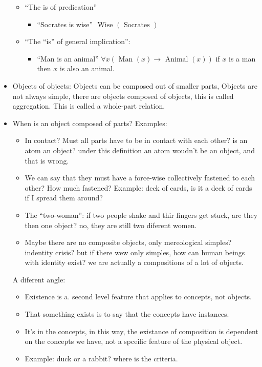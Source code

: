 \begin{itemize}
\begin{itemize}
            \item ``The is of predication''
                \begin{itemize}
                    \item ``Socrates is wise'' $\text{ Wise }(\text{ Socrates })$ 
                \end{itemize}
            
            \item ``The ``is'' of general implication'':
                \begin{itemize}
                    \item ``Man is an animal'' $\forall x (\text{ Man }(x) \rightarrow \text{ Animal }(x))$  if $x$ is a man then $x$ is also an animal.
                \end{itemize}
        \end{itemize}
    
    \item Objects of objects: Objects can be composed out of smaller parts, Objects are not always simple, there are objects composed of objects, this is called aggregation. This is called a whole-part relation.
    \item When is an object composed of parts?
        \newline Examples: 
        \begin{itemize}
            \item In contact? Must all parts have to be in contact with each other? is an atom an object? under this definition an atom woudn't be an  object, and that is wrong.
            \item We can say that they must have a force-wise collectively fastened to each other? How much fastened? Example: deck of cards, is it a deck of cards if I spread them around? 
            \item The ``two-woman'': if two people shake and thir fingers get stuck, are they then one object? no, they are still two diferent women.
            \item Maybe there are no composite objects, only mereological simples? indentity crisis? but if there wew only simples, how can human beings with identity exist? we are actually a compositions of a lot of objects.
        \end{itemize}
        A diferent angle: 
        \begin{itemize}
            \item Existence is a. second level feature that applies to concepts, not objects.
            \item That something exists is to say that the concepts have instances.
            \item It's in the concepts, in this way, the existance of composition is dependent on the concepts we have, not a spceific feature of the physical object.
            \item Example: duck or a rabbit? where is the criteria.
        \end{itemize}
\end{itemize}


